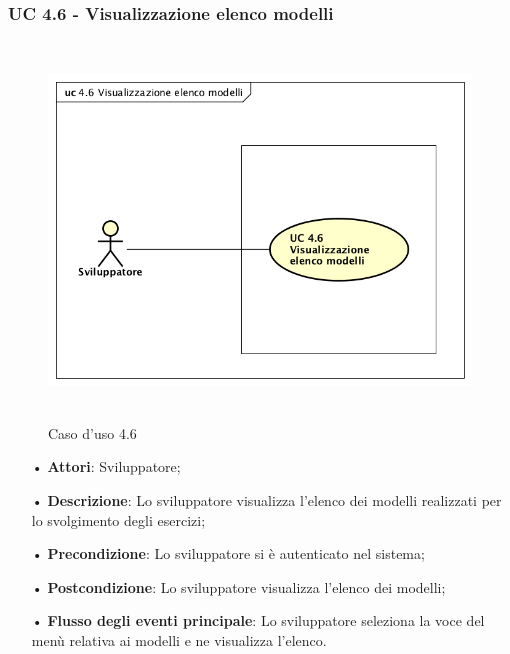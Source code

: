 \subsubsection{UC 4.6 - Visualizzazione elenco modelli}
\begin{figure}[H]
\centering
\includegraphics[width=17cm, height=10cm]{img/UC460.png} 
\caption{Caso d'uso 4.6}\label{fig:460}
\end{figure}
\begin{itemize}
\item[•]\textbf{Attori}: Sviluppatore;
\item[•]\textbf{Descrizione}: Lo sviluppatore visualizza l'elenco dei modelli realizzati per lo svolgimento degli esercizi;
\item[•]\textbf{Precondizione}: Lo sviluppatore si è autenticato nel sistema;
\item[•]\textbf{Postcondizione}: Lo sviluppatore visualizza l'elenco dei modelli;
\item[•]\textbf{Flusso degli eventi principale}:  Lo sviluppatore seleziona la voce del menù relativa ai modelli e ne visualizza l'elenco.
\end{itemize}

